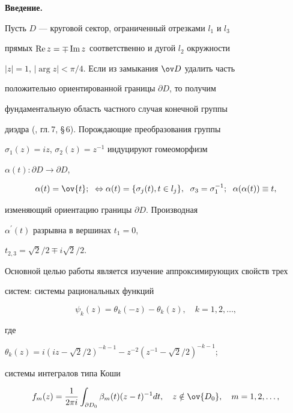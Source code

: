 {\bf Введение.}


Пусть $D$ --- круговой сектор, ограниченный отрезками $l_1$ и $l_3$


прямых $\operatorname{Re} z=\mp\operatorname{Im} z$ соответственно и дугой $l_2$ окружности


$|z|=1$, $|\arg z|<\pi/4$. Если из замыкания $\ov D$ удалить часть


положительно ориентированной границы $\partial D$, то получим


фундаментальную область частного случая конечной группы 


диэдра (\cite{Golub}, гл.\,7, \S\,6). Порождающие преобразования группы


$\sigma_1(z)=iz$, $\sigma_2(z)=z^{-1}$ индуцируют гомеоморфизм


$\alpha(t):\partial D \to \partial D$,


$$




\alpha(t)=\ov{t};\ \;


\Leftrightarrow \alpha(t)=\{\sigma_j(t), t\in l_j\},


\ \; \sigma_3=\sigma_1^{-1} ;


\ \; \alpha(\alpha(t))\equiv t,




$$


изменяющий ориентацию границы $\partial D$. Производная


$\alpha^\prime(t)$ разрывна в вершинах $t_1=0$,


$t_{2,3}=\sqrt2/2\mp i\sqrt2/2$.





Основной целью работы является изучение аппроксимирующих свойств трех


систем: системы рациональных функций


\begin{equation}\label{2}


\psi_k(z)=\theta_k(-z)-\theta_k(z),\quad k=1,2, \dotsc,


\end{equation}


где


$\theta_k(z)=i(iz-\sqrt2/2)^{-k-1}-z^{-2}(z^{-1}-\sqrt2/2)^{-k-1}$;


системы интегралов типа Коши


\begin{equation}\label{3}


f_m(z)=\frac{1}{2\pi i}\int_{\partial D_0}


\beta_m(t)(z-t)^{-1}dt,\quad z\notin\ov{D_0},\quad m=1, 2, \dotsc,


\end{equation}


